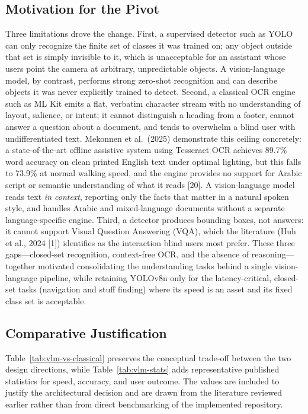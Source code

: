 \documentclass[a4paper]{report}
\begin{document}
\subsection{Motivation for the Pivot}
Three limitations drove the change. First, a supervised detector such as YOLO can only recognize the finite set of classes it was trained on; any object outside that set is simply invisible to it, which is unacceptable for an assistant whose users point the camera at arbitrary, unpredictable objects. A vision-language model, by contrast, performs strong zero-shot recognition and can describe objects it was never explicitly trained to detect. Second, a classical OCR engine such as ML Kit emits a flat, verbatim character stream with no understanding of layout, salience, or intent; it cannot distinguish a heading from a footer, cannot answer a question about a document, and tends to overwhelm a blind user with undifferentiated text. Mekonnen et al.\ (2025) demonstrate this ceiling concretely: a state-of-the-art offline assistive system using Tesseract OCR achieves 89.7\% word accuracy on clean printed English text under optimal lighting, but this falls to 73.9\% at normal walking speed, and the engine provides no support for Arabic script or semantic understanding of what it reads [20]. A vision-language model reads text \emph{in context}, reporting only the facts that matter in a natural spoken style, and handles Arabic and mixed-language documents without a separate language-specific engine. Third, a detector produces bounding boxes, not answers: it cannot support Visual Question Answering (VQA), which the literature (Huh et al., 2024 [1]) identifies as the interaction blind users most prefer. These three gaps---closed-set recognition, context-free OCR, and the absence of reasoning---together motivated consolidating the understanding tasks behind a single vision-language pipeline, while retaining YOLOv8n only for the latency-critical, closed-set tasks (navigation and stuff finding) where its speed is an asset and its fixed class set is acceptable.

\subsection{Comparative Justification}
Table~\ref{tab:vlm-vs-classical} preserves the conceptual trade-off between the two design directions, while Table~\ref{tab:vlm-stats} adds representative published statistics for speed, accuracy, and user outcome. The values are included to justify the architectural decision and are drawn from the literature reviewed earlier rather than from direct benchmarking of the implemented repository.
\end{document}
